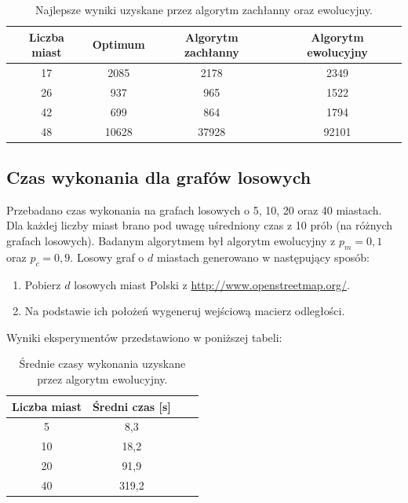 \documentclass[12pt, a4paper]{article}
\begin{document}
\begin{table}[h]
\centering
	\begin{tabular}{ | c | c | c | c | } 
		\hline
  		Liczba miast & Optimum & Algorytm zachłanny & Algorytm ewolucyjny \\
  		\hline
  		17 & 2085 & 2178 & 2349 \\
  		\hline
  		26 & 937 & 965 & 1522\\
  		\hline
  		42 & 699 & 864 & 1794\\
  		\hline
  		48 & 10628 & 37928 & 92101\\
  		\hline
	\end{tabular}
\caption{Najlepsze wyniki uzyskane przez algorytm zachłanny oraz ewolucyjny.}
\end{table}

\subsection{Czas wykonania dla grafów losowych}

Przebadano czas wykonania na grafach losowych o 5, 10, 20 oraz 40 miastach.
Dla każdej liczby miast brano pod uwagę uśredniony czas z 10 prób (na różnych grafach losowych).
Badanym algorytmem był algorytm ewolucyjny z $p_m=0,1$ oraz $p_c=0,9$.
Losowy graf o $d$ miastach generowano w następujący sposób:

\begin{enumerate}
 \item Pobierz $d$ losowych miast Polski z \url{http://www.openstreetmap.org/}.
 \item Na podstawie ich położeń wygeneruj wejściową macierz odległości.
\end{enumerate}

Wyniki eksperymentów przedstawiono w poniższej tabeli:

\begin{table}[h]
\centering
	\begin{tabular}{ | c | c | c | c | } 
		\hline
  		Liczba miast & Średni czas [s] \\
  		\hline
  		5 & 8,3 \\
  		\hline
  		10 & 18,2 \\
  		\hline
  		20 & 91,9 \\
  		\hline
  		40 & 319,2 \\
  		\hline
	\end{tabular}
\caption{Średnie czasy wykonania uzyskane przez algorytm ewolucyjny.}
\end{table}
\end{document}
